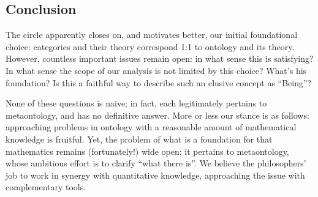 \subsection{Conclusion}
The circle apparently closes on, and motivates better, our initial foundational choice: categories and their theory correspond 1:1 to ontology and its theory. However, countless important issues remain open: in what sense this is satisfying? In what sense the scope of our analysis is not limited by this choice? What's his foundation? Is this a faithful way to describe such an elusive concept as ``Being''?

None of these questions is naive; in fact, each legitimately pertains to metaontology, and has no definitive answer. More or less our stance is as follows: approaching problems in ontology with a reasonable amount of mathematical knowledge is fruitful. Yet, the problem of what is a foundation for that mathematics remains (fortunately!) wide open; it pertains to metaontology, whose ambitious effort is to clarify ``what there is''. We believe the philosophers' job to work in synergy with quantitative knowledge, approaching the issue with complementary tools.
